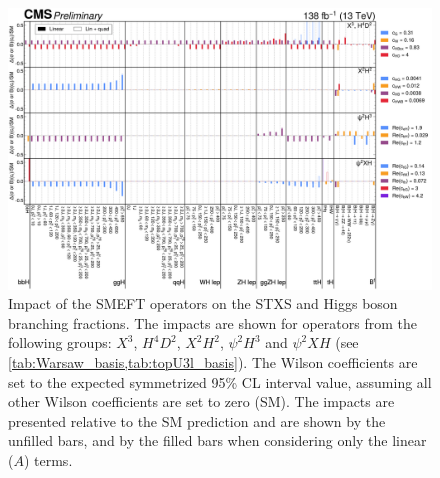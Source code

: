 \begin{landscape}
  \begin{figure}
    \centering
    \includegraphics[width=\pagewidth]{Figures/EFT/HIG-21-018-Figure_014.pdf}
      \caption[Impact of SMEFT Operators in the SMEFT Basis (1)]{Impact of the SMEFT operators on the STXS and Higgs boson branching fractions. The impacts are shown for operators from the following groups: $X^3$, $H^4D^2$, $X^2H^2$, $\psi^2H^3$ and $\psi^2XH$ (see \cref{tab:Warsaw_basis,tab:topU3l_basis}). The Wilson coefficients are set to the expected symmetrized 95\% CL interval value, assuming all other Wilson coefficients are set to zero (SM). The impacts are presented relative to the SM prediction and are shown by the unfilled bars, and by the filled bars when considering only the linear ($A$) terms.}\label{fig:smeft_parametrisation_part1}
  \end{figure}
\end{landscape}


